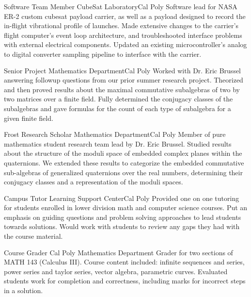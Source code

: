 \documentclass[letterpaper, 11pt, sans]{moderncv}
\begin{document}
        {Software Team Member}
        {CubeSat Laboratory}{Cal Poly}{}
        {
            Software lead for NASA ER-2 custom cubesat payload carrier, as well as a payload designed to record the in-flight vibrational profile of launches.
            Made extensive changes to the carrier's flight computer's event loop architecture, and troubleshooted interface problems with external electrical components.
            Updated an existing microcontroller's analog to digital converter sampling pipeline to interface with the carrier.
        }

        {Senior Project}
        {Mathematics Department}{Cal Poly}{}
        {
            Worked with Dr. Eric Brussel answering followup questions from our prior summer research project.
            Theorized and then proved results about the maximal commutative subalgebras of two by two matrices over a finite field.
            Fully determined the conjugacy classes of the subalgebras and gave formulas for the count of each type of subalgebra for a given finite field.
        }

        {Frost Research Scholar}
        {Mathematics Department}{Cal Poly}{}
        {
            Member of pure mathematics student research team lead by Dr. Eric Brussel.
            Studied results about the structure of the moduli space of embedded complex planes within the quaternions.
            We extended these results to categorize the embedded commutative sub-algebras of generalized quaternions over the real numbers, determining their conjugacy classes and a representation of the moduli spaces.
        }

        {Campus Tutor}
        {Learning Support Center}{Cal Poly}{}
        {
            Provided one on one tutoring for students enrolled in lower division math and computer science courses.
            Put an emphasis on guiding questions and problem solving approaches to lead students towards solutions.
            Would work with students to review any gaps they had with the course material.
        }

        {Course Grader}
        {Cal Poly Mathematics Department}{}{}
        {
            Grader for two sections of MATH 143 (Calculus III).
            Course content included: infinite sequences and series, power series and taylor series, vector algebra, parametric curves.
            Evaluated students work for completion and correctness, including marks for incorrect steps in a solution.
        }
\end{document}
